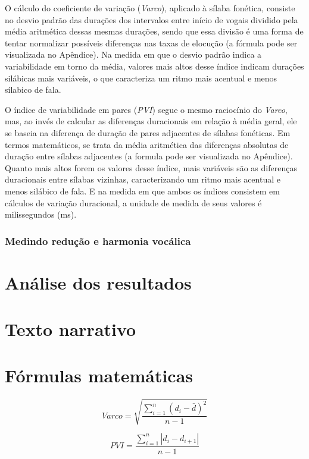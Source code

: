 \documentclass[12pt,a4paper,oneside]{article}
\begin{document}
	    O cálculo do coeficiente de variação (\emph{Varco}), aplicado à sílaba fonética, consiste
	    no desvio padrão das durações dos intervalos entre início de vogais dividido pela média
	    aritmética dessas mesmas durações, sendo que essa divisão é uma forma de tentar
	    normalizar possíveis diferenças nas taxas de elocução (a fórmula pode ser visualizada no
	    Apêndice). Na medida em que o desvio padrão indica a variabilidade em torno da média,
	    valores mais altos desse índice indicam durações silábicas mais variáveis, o que
	    caracteriza um ritmo mais acentual e menos sílabico de fala.

	    O índice de variabilidade em pares (\emph{PVI}) segue o mesmo raciocínio do
	    \emph{Varco}, mas, ao invés de calcular as diferenças duracionais em relação à média
	    geral, ele se baseia na diferença de duração de pares adjacentes de sílabas fonéticas.
	    Em termos matemáticos, se trata da média aritmética das diferenças absolutas de duração
	    entre sílabas adjacentes (a formula pode ser visualizada no Apêndice). Quanto mais altos
	    forem os valores desse índice, mais variáveis são as diferenças duracionais entre
	    sílabas vizinhas, caracterizando um ritmo mais acentual e menos silábico de fala. E na
	    medida em que ambos os índices consistem em cálculos de variação duracional, a unidade
	    de medida de seus valores é milissegundos (ms).

	    \subsubsection{Medindo redução e harmonia vocálica}

    \section{Análise dos resultados}
	    

	    

    { %
	\printbibliography
    }

    \begin{appendix}
	\section{Texto narrativo}
	\section{Fórmulas matemáticas}
		\begin{equation}
		    Varco = \sqrt{\frac{\sum_{i=1}^{n}(d_{i}-\bar{d})^{2}}{n-1}} 
		\end{equation}

		\begin{equation}
		    PVI = \frac{\sum_{i=1}^{n}|d_{i}-d_{i+1}|}{n-1} 
		\end{equation}
    \end{appendix}

    
\end{document}
